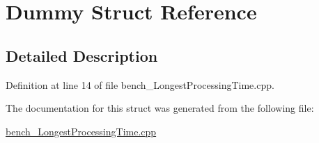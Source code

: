 \hypertarget{struct_dummy}{}\section{Dummy Struct Reference}
\label{struct_dummy}


\subsection{Detailed Description}


Definition at line 14 of file bench\+\_\+\+Longest\+Processing\+Time.\+cpp.



The documentation for this struct was generated from the following file\+:\begin{DoxyCompactItemize}
\item 
\hyperlink{bench___longest_processing_time_8cpp}{bench\+\_\+\+Longest\+Processing\+Time.\+cpp}\end{DoxyCompactItemize}
